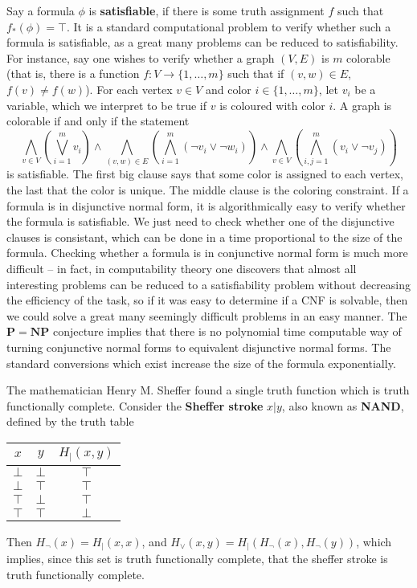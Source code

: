 Say a formula $\phi$ is {\bf satisfiable}, if there is some truth assignment $f$ such that $f_*(\phi) = \top$. It is a standard computational problem to verify whether such a formula is satisfiable, as a great many problems can be reduced to satisfiability. For instance, say one wishes to verify whether a graph $(V,E)$ is $m$ colorable (that is, there is a function $f: V \to \{ 1, \dots, m \}$ such that if $(v,w) \in E$, $f(v) \neq f(w)$). For each vertex $v \in V$ and color $i \in \{ 1, \dots, m \}$, let $v_i$ be a variable, which we interpret to be true if $v$ is coloured with color $i$. A graph is colorable if and only if the statement
%
\[ \bigwedge_{v \in V} \left( \bigvee_{i = 1}^m v_i \right) \wedge \bigwedge_{(v,w) \in E} \left( \bigwedge_{i = 1}^m (\neg v_i \vee \neg w_i) \right) \wedge \bigwedge_{v \in V} \left( \bigwedge_{i,j = 1}^m (v_i \vee \neg v_j) \right) \]
%
is satisfiable. The first big clause says that some color is assigned to each vertex, the last that the color is unique. The middle clause is the coloring constraint. If a formula is in disjunctive normal form, it is algorithmically easy to verify whether the formula is satisfiable. We just need to check whether one of the disjunctive clauses is consistant, which can be done in a time proportional to the size of the formula. Checking whether a formula is in conjunctive normal form is much more difficult -- in fact, in computability theory one discovers that almost all interesting problems can be reduced to a satisfiability problem without decreasing the efficiency of the task, so if it was easy to determine if a CNF is solvable, then we could solve a great many seemingly difficult problems in an easy manner. The $\mathbf{P} = \mathbf{NP}$ conjecture implies that there is no polynomial time computable way of turning conjunctive normal forms to equivalent disjunctive normal forms. The standard conversions which exist increase the size of the formula exponentially.

\begin{example}
    The mathematician Henry M. Sheffer found a single truth function which is truth functionally complete. Consider the {\bf Sheffer stroke} $x|y$, also known as {\bf NAND}, defined by the truth table
    \begin{center}
    \begin{tabular}{| c | c | c |}
        \hline $x$ & $y$ & $H_|(x,y)$\\
        \hline $\bot$ & $\bot$ & $\top$\\
        $\bot$ & $\top$ & $\top$\\
        $\top$ & $\bot$ & $\top$\\
        $\top$ & $\top$ & $\bot$\\
        \hline
    \end{tabular}
    \end{center}
    Then $H_\neg(x) = H_|(x,x)$, and $H_\vee(x,y) = H_|(H_\neg(x), H_\neg(y))$, which implies, since this set is truth functionally complete, that the sheffer stroke is truth functionally complete.
\end{example}

